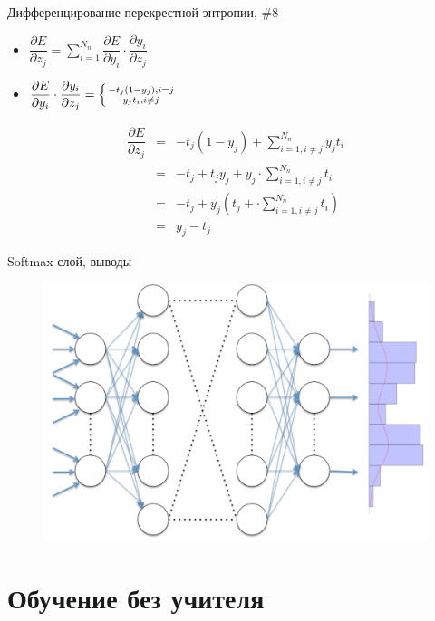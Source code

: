 \documentclass[10pt]{beamer}
\begin{document}
\begin{frame}{Дифференцирование перекрестной энтропии, \#8}

\begin{itemize}
	\item $\dfrac{\partial E}{\partial z_j} = \sum_{i = 1}^{N_{n}} \dfrac{\partial E}{\partial y_i} \cdot \dfrac{\partial y_i}{\partial z_j}$
	\item $\dfrac{\partial E}{\partial y_i} \cdot \dfrac{\partial y_i}{\partial z_j} = \left\{ { -t_j\left(1 - y_j\right), i = j \atop y_j t_i, i \neq j } \right.$
\end{itemize}

\begin{eqnarray*}
\dfrac{\partial E}{\partial z_j} &=& -t_j\left(1 - y_j\right) + \sum_{i = 1, i \neq j}^{N_{n}} y_j t_i \\
&=& -t_j + t_j y_j + y_j \cdot \sum_{i = 1, i \neq j}^{N_{n}} t_i \\
&=& -t_j + y_j \left(t_j + \cdot \sum_{i = 1, i \neq j}^{N_{n}} t_i \right) \\
&=& y_j - t_j
\end{eqnarray*}

\end{frame}


\begin{frame}{Softmax слой, выводы}
\begin{figure}[h!]
  \centering
  \includegraphics[width=1\textwidth]{images/nn_softmax.png}
\end{figure}
\end{frame}


\section{Обучение без учителя}
\end{document}

